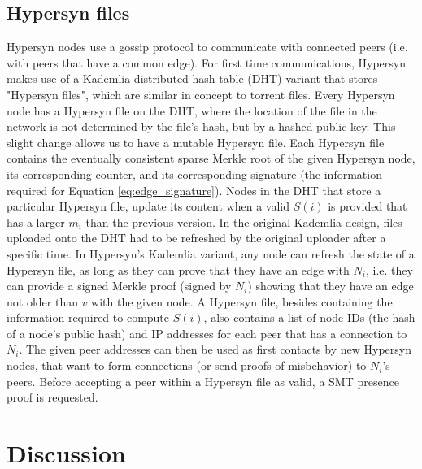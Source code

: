 \documentclass{article}
\begin{document}



\subsection{Hypersyn files}
\label{ss: network}

Hypersyn nodes use a gossip protocol to communicate with connected peers (i.e. with peers that have a common edge). For first time communications, Hypersyn makes use of a Kademlia \cite{goos_kademlia_2002} distributed hash table (DHT) variant that stores "Hypersyn files", which are similar in concept to torrent files. Every Hypersyn node has a Hypersyn file on the DHT, where the location of the file in the network is not determined by the file's hash, but by a hashed public key. This slight change allows us to have a mutable Hypersyn file. Each Hypersyn file contains the eventually consistent sparse Merkle root of the given Hypersyn node, its corresponding counter, and its corresponding signature (the information required for Equation \ref{eq:edge_signature}). Nodes in the DHT that store a particular Hypersyn file, update its content when a valid $S(i)$ is provided that has a larger $m_i$ than the previous version. In the original Kademlia design, files uploaded onto the DHT had to be refreshed by the original uploader after a specific time. In Hypersyn's Kademlia variant, any node can refresh the state of a Hypersyn file, as long as they can prove that they have an edge with $N_i$, i.e. they can provide a signed Merkle proof (signed by $N_i$) showing that they have an edge not older than $v$ with the given node. A Hypersyn file, besides containing the information required to compute $S(i)$, also contains a list of node IDs (the hash of a node's public hash) and IP addresses for each peer that has a connection to $N_i$. The given peer addresses can then be used as first contacts by new Hypersyn nodes, that want to form connections (or send proofs of misbehavior) to $N_i$'s peers. Before accepting a peer within a Hypersyn file as valid, a SMT presence proof is requested. 


\section{Discussion}
\label{s: discussion}
\end{document}
